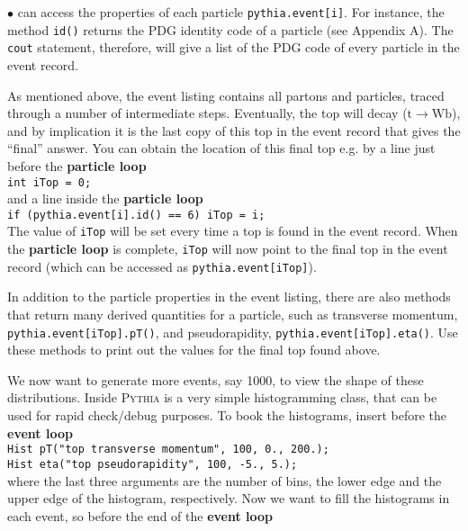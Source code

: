 \documentclass[12pt,a4paper]{article}
\renewcommand{\b}{{\mathrm b}}
\renewcommand{\t}{{\mathrm t}}
\newcommand{\W}{{\mathrm W}}
\newenvironment{Itemize}{\begin{list}{$\bullet$}%
{\setlength{\topsep}{0.4mm}\setlength{\partopsep}{0.4mm}%
\setlength{\itemsep}{0.4mm}\setlength{\parsep}{0.4mm}}}%
{\end{list}}
\begin{document}
\begin{Itemize}
can access the properties of each particle \texttt{pythia.event[i]}. For
instance, the method \texttt{id()} returns the PDG identity code of a
particle (see Appendix A). The \texttt{cout} statement, therefore, will
give a list of the PDG code of every particle in the event record.
\item As mentioned above, the event listing contains all partons and
particles, traced through a number of intermediate steps. Eventually, the
top will decay ($\t \to \W \b$), and by implication it is the last copy of
this top in the event record that gives the ``final'' answer. You can obtain
the location of this final top e.g. by a line just before the
\textbf{particle loop} \\
\hspace*{10mm}\texttt{int iTop = 0;} \\
and a line inside the \textbf{particle loop} \\
\hspace*{10mm}\texttt{if (pythia.event[i].id() == 6) iTop = i;} \\ 
The value of \texttt{iTop} will be set every time a top is found in the
event record. When the \textbf{particle loop} is complete, \texttt{iTop}
will now point to the final top in the event record (which can be accessed
as \texttt{pythia.event[iTop]}).
\item In addition to the particle properties in the event listing,  
there are also methods that return many derived quantities for a 
particle, such as transverse momentum, \texttt{pythia.event[iTop].pT()},
and pseudorapidity, \texttt{pythia.event[iTop].eta()}. Use these methods
to print out the values for the final top found above. 
\item We now want to generate more events, say 1000, to view the shape
of these distributions. Inside \textsc{Pythia} is a very simple
histogramming class, that can be used for rapid check/debug purposes. To
book the histograms, insert before the \textbf{event loop} \\
\hspace*{10mm}\texttt{Hist pT("top transverse momentum", 100, 0., 200.);}\\
\hspace*{10mm}\texttt{Hist eta("top pseudorapidity", 100, -5., 5.);}\\
where the last three arguments are the number of bins, the lower edge and
the upper edge of the histogram, respectively. Now we want to fill the
histograms in each event, so before the end of the \textbf{event loop}

\end{Itemize}
\end{document}
